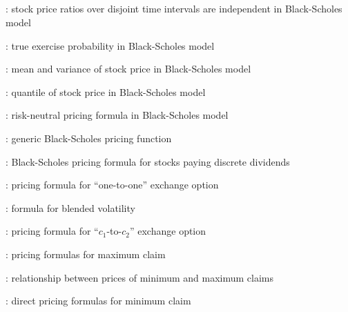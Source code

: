 \subsection*{}
\item {}: stock price ratios over disjoint time intervals are independent in Black-Scholes model
\item {}: true exercise probability in Black-Scholes model
\item {}: mean and variance of stock price in Black-Scholes model
\item {}: quantile of stock price in Black-Scholes model
\item {}: risk-neutral pricing formula in Black-Scholes model
\item {}: generic Black-Scholes pricing function
\item {}: Black-Scholes pricing formula for stocks paying discrete dividends
\item {}: pricing formula for ``one-to-one'' exchange option
\item {}: formula for blended volatility
\item {}: pricing formula for
``\(c_1\)-to-\(c_2\)'' exchange option
\item {}: pricing formulas for maximum claim
\item {}: relationship between prices of minimum and maximum claims
\item {}: direct pricing formulas for minimum claim
